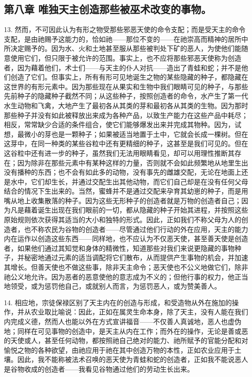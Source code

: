 
\subsection{第八章  唯独天主创造那些被巫术改变的事物。}

13. 然而，不可因此认为有形之物受那些邪恶天使的命令支配；而是受天主的命令支配，是由祂赐予这能力的，恰如祂——那位不变的——在祂崇高而精神的居所中所决定赐予的。因为水、火和土地甚至服从那些被判处下矿的恶人，为使他们能随意使用它们，但只限于被允许的范围。事实上，也不应将那些邪恶天使称为创造者，因为藉着他们，术士们——与天主的仆人对抗——造出了青蛙和蛇；并不是他们创造了它们。但事实上，所有有形可见地诞生之物的某些隐藏的种子，都隐藏在这世界的有形元素中。因为那些现在从果实和生物中我们眼睛可见的种子，与那些先前种子的隐藏种子截然不同；从这些种子，按照创造者的命令，水产生了第一代水生动物和飞禽，大地产生了最初各从其类的芽和最初各从其类的生物。因为那时那些种子并没有如此被释放出来成为各种产品，以致生产能力在这些产品中耗尽；相反，常常缺少合适的条件组合，使它们能够爆发出来并完成其物种。因为，试想，最微小的芽也是一颗种子；如果被适当地置于土中，它就会长成一棵树。但在这芽中，在同一种类的某些谷粒中还有更精细的种子，这甚至是我们可见的。但在这谷粒中还有进一步的种子，虽然我们无法用眼睛看见，却可以用理性推断其存在；因为除非在那些元素中有某种这样的力量，否则就不会如此频繁地从地里生出没有播种的东西；也不会有如此多的动物，没有事先的雌雄交配，无论在地面上还是水中，它们却生长，并通过交配生出其他动物，而它们自己却是在没有任何父母结合的情况下生出来的。当然，蜜蜂并不是通过交配来孕育其幼崽的种子，而是用嘴从地上收集散落的种子。因为这些无形种子的创造者就是万物的创造者自己；因为凡是藉着诞生出现在我们眼前的一切，都从隐藏的种子开始其进程，并按照这些原始规则依次获得其适当的大小和独特的形式。因此，正如我们不称父母为人的创造者，也不称农民为谷物的创造者——尽管通过他们行动的外在应用，天主的能力内在运作以创造这些东西——同样地，也不应认为不仅恶天使，甚至善天使是创造者，如果他们通过其知觉和身体的精微性，知道那些对我们来说更隐藏的事物种子，并秘密地通过元素的适当调配将它们散布，从而提供产生事物的机会，并加速其增长。但善天使也不做这些事，除非天主命令；恶天使也不公义地做它们，除非祂公义地允许。因为恶者的恶意使他的意志成为不义的；但他行事的权力，他正当地领受，或为惩罚他自己，或就别人而言，为惩罚恶人，或为赞美善人。\par

14. 相应地，宗徒保禄区别了天主内在的创造与形成，和受造物从外在施加的操作，并从农业取比喻说：因此，正如在属灵生命本身，除了天主，没有人能在我们内完成义德，然而人也能以外在方式宣讲福音——不仅善人真诚地，恶人也虚伪地；同样在可见事物的创造中，是天主从内在工作；而外在的操作，无论是善或恶的天使或人，甚至任何动物，都按照祂自己绝对的能力、祂所赋予的官能分配和对愉悦之物的各种欲望，由祂应用于祂在其中创造万物的本性，正如农业应用于土壤。因此，我不能称被法术召唤的恶天使为青蛙和蛇的创造者，正如我不能说恶人是谷物收成的创造者——我看见谷物通过他们的劳动生长出来。\par

